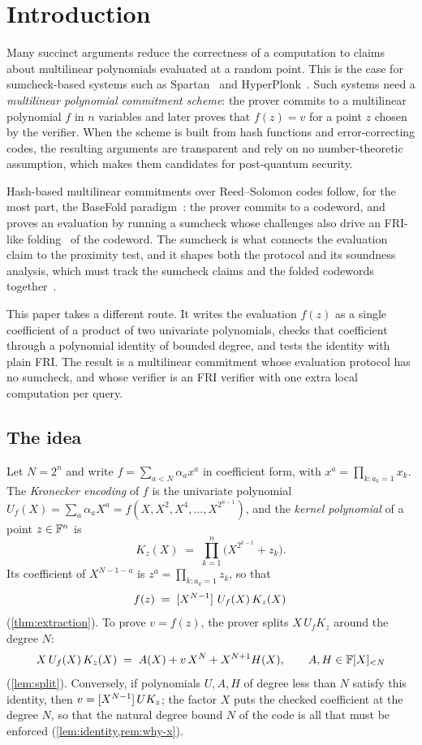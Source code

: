 \section{Introduction}\label{sec:intro}

Many succinct arguments reduce the correctness of a computation to claims about multilinear polynomials evaluated at a random point.
This is the case for sumcheck-based systems such as Spartan~\cite{Set20} and HyperPlonk~\cite{CBBZ23}.
Such systems need a \emph{multilinear polynomial commitment scheme}: the prover commits to a multilinear polynomial $f$ in $n$ variables and later proves that $f(z) = v$ for a point $z$ chosen by the verifier.
When the scheme is built from hash functions and error-correcting codes, the resulting arguments are transparent and rely on no number-theoretic assumption, which makes them candidates for post-quantum security.

Hash-based multilinear commitments over Reed--Solomon codes follow, for the most part, the BaseFold paradigm~\cite{ZCF24}: the prover commits to a codeword, and proves an evaluation by running a sumcheck whose challenges also drive an FRI-like folding~\cite{BBHR18} of the codeword.
The sumcheck is what connects the evaluation claim to the proximity test, and it shapes both the protocol and its soundness analysis, which must track the sumcheck claims and the folded codewords together~\cite{ZCF24,GLHQTZ25,Mkh26}.

This paper takes a different route. It writes the evaluation $f(z)$ as a single coefficient of a product of two univariate polynomials, checks that coefficient through a polynomial identity of bounded degree, and tests the identity with plain FRI.
The result is a multilinear commitment whose evaluation protocol has no sumcheck, and whose verifier is an FRI verifier with one extra local computation per query.

\subsection{The idea}\label{sec:intro:idea}

Let $N = 2^n$ and write $f = \sum_{a < N} \alpha_a x^a$ in coefficient form, with $x^a = \prod_{k : a_k = 1} x_k$.
The \emph{Kronecker encoding} of $f$ is the univariate polynomial $U_f(X) = \sum_a \alpha_a X^a = f(X, X^2, X^4, \dots, X^{2^{n-1}})$, and the \emph{kernel polynomial} of a point $z \in \mathbb{F}^n$ is
\[
  K_z(X) \;=\; \prod_{k=1}^{n} \bigl(X^{2^{k-1}} + z_k\bigr).
\]
Its coefficient of $X^{N-1-a}$ is $z^a = \prod_{k : a_k = 1} z_k$, so that
\[
  f(z) \;=\; [X^{N-1}]\,\,U_f(X)\, K_z(X)\,
\]
(\cref{thm:extraction}).
To prove $v = f(z)$, the prover splits $X\,U_f K_z$ around the degree $N$:
\[
  X\,U_f(X)\,K_z(X) \;=\; A(X) + v\,X^N + X^{N+1} H(X), \qquad A, H \in \mathbb{F}[X]_{<N}
\]
(\cref{lem:split}). Conversely, if polynomials $U, A, H$ of degree less than $N$ satisfy this identity, then $v = [X^{N-1}]\,U K_z$; the factor $X$ puts the checked coefficient at the degree $N$, so that the natural degree bound $N$ of the code is all that must be enforced (\cref{lem:identity,rem:why-x}).

